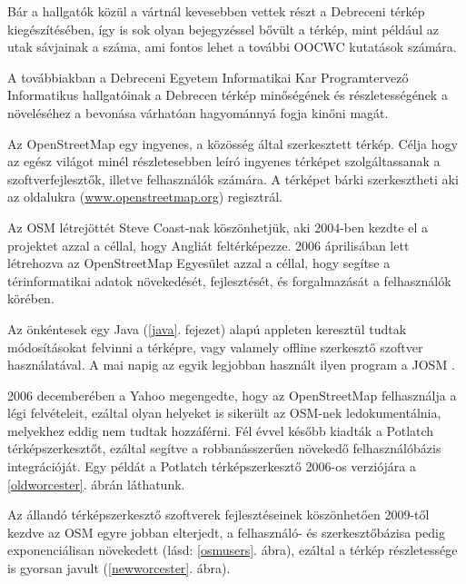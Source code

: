 \documentclass[a4paper,12pt]{report}
\begin{document}
\vspace{2mm}
Bár a hallgatók közül a vártnál kevesebben vettek részt a Debreceni térkép kiegészítésében, így is sok olyan bejegyzéssel bővült a térkép, mint például az utak sávjainak a száma, ami fontos lehet a további OOCWC kutatások számára.

\vspace{2mm}
A továbbiakban a Debreceni Egyetem Informatikai Kar Programtervező Informatikus hallgatóinak a Debrecen térkép minőségének és részletességének a növeléséhez a bevonása várhatóan hagyománnyá fogja kinőni magát.

\vspace{2mm}
Az OpenStreetMap egy ingyenes, a közösség által szerkesztett térkép. Célja hogy az egész világot minél részletesebben leíró ingyenes térképet szolgáltassanak a szoftverfejlesztők, illetve felhasználók számára. A térképet bárki szerkesztheti aki az oldalukra (\url{www.openstreetmap.org}) regisztrál. 

\vspace{2mm}
Az OSM létrejöttét Steve Coast-nak köszönhetjük, aki 2004-ben kezdte el a projektet azzal a céllal, hogy Angliát feltérképezze. 2006 áprilisában lett létrehozva az OpenStreetMap Egyesület azzal a céllal, hogy segítse a térinformatikai adatok növekedését, fejlesztését, és forgalmazását a felhasználók körében.

\vspace{2mm}
Az önkéntesek egy Java (\ref{java}. fejezet) alapú appleten keresztül tudtak módosításokat felvinni a térképre, vagy valamely offline szerkesztő szoftver használatával. A mai napig az egyik legjobban használt ilyen program a JOSM \cite{josm}.

\vspace{2mm}
2006 decemberében a Yahoo megengedte, hogy az OpenStreetMap felhasználja a légi felvételeit, ezáltal olyan helyeket is sikerült az OSM-nek ledokumentálnia, melyekhez eddig nem tudtak hozzáférni. Fél évvel később kiadták a Potlatch \cite{potlatch} térképszerkesztőt, ezáltal segítve a robbanásszerűen növekedő felhasználóbázis integrációját. Egy példát a Potlatch térképszerkesztő 2006-os verziójára a \ref{oldworcester}. ábrán láthatunk.

\vspace{2mm}
Az állandó térképszerkesztő szoftverek fejlesztéseinek köszönhetően 2009-től kezdve az OSM egyre jobban elterjedt, a felhasználó- és szerkesztőbázisa pedig exponenciálisan növekedett (lásd: \ref{osmusers}. ábra), ezáltal a térkép részletessége is gyorsan javult (\ref{newworcester}. ábra).
\end{document}
